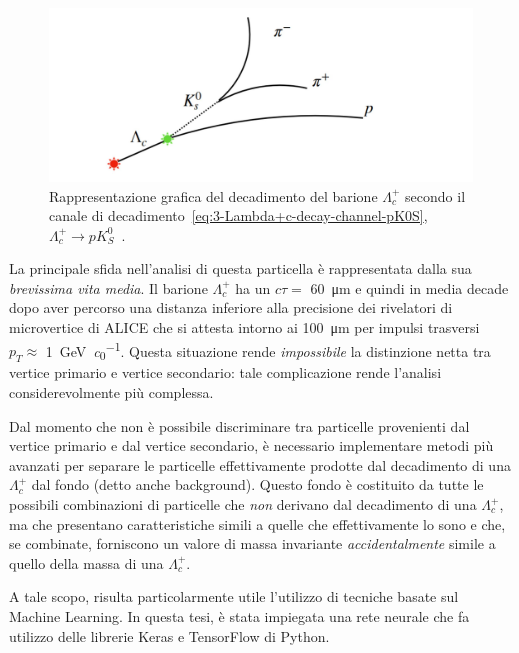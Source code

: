 \begin{figure}[t]
    \centering
    \includegraphics[width=1\linewidth]{res/fig/3-chapter/1-Lambda+c-decay.jpg}
    \caption{Rappresentazione grafica del decadimento del barione $\Lambda_{c}^{+}$ secondo il canale di decadimento~\ref{eq:3-Lambda+c-decay-channel-pK0S}, $\Lambda_{c}^{+} \to p K^{0}_{S}$~\cite{Fusconi_2022}.}
    \label{fig:3-1-Lambda+c-decay}
\end{figure}

La principale sfida nell’analisi di questa particella è rappresentata dalla sua \textit{brevissima vita media}. Il barione $\Lambda_{c}^{+}$ ha un $c \tau =$ \qty{60}{\micro \meter} e quindi in media decade dopo aver percorso una distanza inferiore alla precisione dei rivelatori di microvertice di ALICE che si attesta intorno ai \qty{100}{\micro \meter} per impulsi trasversi $p_{T} \approx$ \qty{1}{\giga \eV \per \clight}. Questa situazione rende \textit{impossibile} la distinzione netta tra vertice primario e vertice secondario: tale complicazione rende l’analisi considerevolmente più complessa.

Dal momento che non è possibile discriminare tra particelle provenienti dal vertice primario e dal vertice secondario, è necessario implementare metodi più avanzati per separare le particelle effettivamente prodotte dal decadimento di una $\Lambda_{c}^{+}$ dal fondo (detto anche background). Questo fondo è costituito da tutte le possibili combinazioni di particelle che \textit{non} derivano dal decadimento di una $\Lambda_{c}^{+}$, ma che presentano caratteristiche simili a quelle che effettivamente lo sono e che, se combinate, forniscono un valore di massa invariante \textit{accidentalmente} simile a quello della massa di una $\Lambda_{c}^{+}$.

A tale scopo, risulta particolarmente utile l’utilizzo di tecniche basate sul Machine Learning. In questa tesi, è stata impiegata una rete neurale che fa utilizzo delle librerie Keras e TensorFlow di Python.

